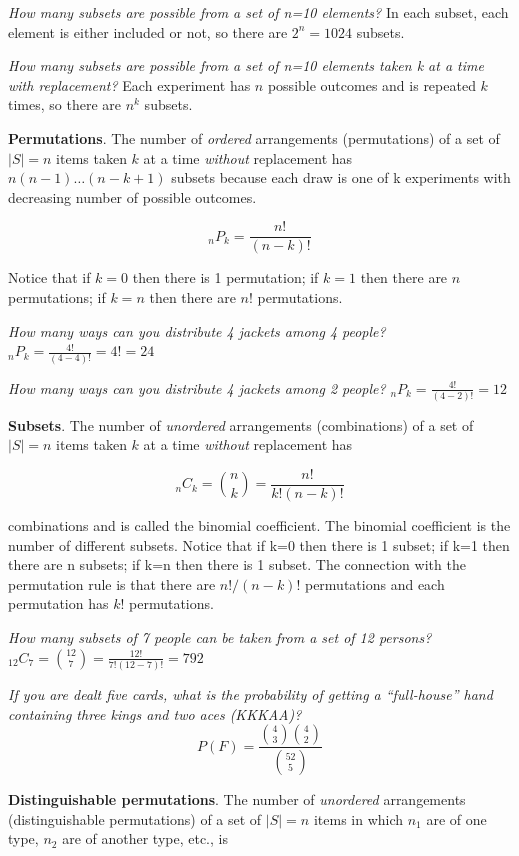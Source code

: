 \documentclass[]{book}
\begin{document}
\emph{How many subsets are possible from a set of n=10 elements?}
In each subset, each element is either included or not, so there are \(2^n = 1024\) subsets.

\emph{How many subsets are possible from a set of n=10 elements taken k at a time with replacement?}
Each experiment has \(n\) possible outcomes and is repeated \(k\) times, so there are \(n^k\) subsets.

\textbf{Permutations}. The number of \emph{ordered} arrangements (permutations) of a set of \(|S|=n\) items taken \(k\) at a time \emph{without} replacement has \(n(n-1) \dots (n-k+1)\) subsets because each draw is one of k experiments with decreasing number of possible outcomes.

\[_nP_k = \frac{n!}{(n-k)!}\]

Notice that if \(k=0\) then there is 1 permutation; if \(k=1\) then there are \(n\) permutations; if \(k=n\) then there are \(n!\) permutations.

\emph{How many ways can you distribute 4 jackets among 4 people?}
\(_nP_k = \frac{4!}{(4-4)!} = 4! = 24\)

\emph{How many ways can you distribute 4 jackets among 2 people?}
\(_nP_k = \frac{4!}{(4-2)!} = 12\)

\textbf{Subsets}. The number of \emph{unordered} arrangements (combinations) of a set of \(|S|=n\) items taken \(k\) at a time \emph{without} replacement has

\[_nC_k = {n \choose k} = \frac{n!}{k!(n-k)!}\]

combinations and is called the binomial coefficient. The binomial coefficient is the number of different subsets. Notice that if k=0 then there is 1 subset; if k=1 then there are n subsets; if k=n then there is 1 subset. The connection with the permutation rule is that there are \(n!/(n-k)!\) permutations and each permutation has \(k!\) permutations.

\emph{How many subsets of 7 people can be taken from a set of 12 persons?}
\(_{12}C_7 = {12 \choose 7} = \frac{12!}{7!(12-7)!} = 792\)

\emph{If you are dealt five cards, what is the probability of getting a ``full-house'' hand containing three kings and two aces (KKKAA)?}
\[P(F) = \frac{{4 \choose 3} {4 \choose 2}}{{52 \choose 5}}\]

\textbf{Distinguishable permutations}. The number of \emph{unordered} arrangements (distinguishable permutations) of a set of \(|S|=n\) items in which \(n_1\) are of one type, \(n_2\) are of another type, etc., is
\end{document}
